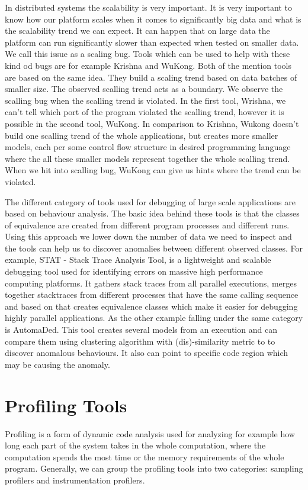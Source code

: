 In distributed systems the scalability is very important. It is very important to know how our platform scales when it comes to significantly big data and what is the scalability trend we can expect. It can happen that on large data the platform can run significantly slower than expected when tested on smaller data. We call this issue as a scaling bug. Tools which can be used to help with these kind od bugs are for example Krishna and WuKong. Both of the mention tools are based on the same idea. They build a scaling trend based on data batches of smaller size. The observed scalling trend acts as a boundary. We observe the scalling bug when the scalling trend is violated. In the first tool, Wrishna, we can't tell which port of the program violated the scalling trend, however it is possible in the second tool, WuKong. In comparison to Krishna, Wukong doesn't build one scalling trend of the whole applications, but creates more smaller models, each per some control flow structure in desired programming language where the all these smaller models represent together the whole scalling trend. When we hit into scalling bug, WuKong can give us hints where the trend can be violated.

The different category of tools used for debugging of large scale applications are based on behaviour analysis. The basic idea behind these tools is that the classes of equivalence are created from different program processes and different runs. Using this approach we lower down the number of data we need to inspect and the tools can help us to discover anomalies between different observed classes. For example, STAT - Stack Trace Analysis Tool, is a lightweight and scalable debugging tool used for identifying errors on massive high performance computing platforms. It gathers stack traces from all parallel executions, merges together stacktraces from different processes that have the same calling sequence and based on that creates equivalence classes which make it easier for debugging highly parallel applications. As the other example falling under the same category is AutomaDed. This tool creates several models from an execution and can compare them using clustering algorithm with (dis)-similarity metric to to discover anomalous behaviours. It also can point to specific code region which may be causing the anomaly.

\section{Profiling Tools}
Profiling is a form of dynamic code analysis used for analyzing for example how long each part of the system takes in the whole computation, where the computation spends the most time or the memory requirements of the whole program. Generally, we can group the profiling tools into two categories: sampling profilers and instrumentation profilers.

